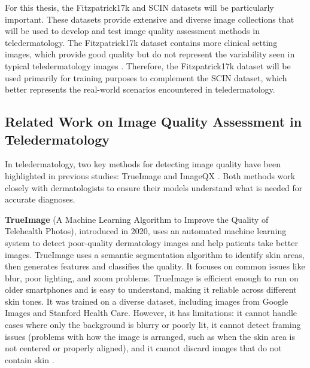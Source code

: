 \noindent
For this thesis, the Fitzpatrick17k and SCIN datasets will be particularly important. These datasets provide extensive and diverse image collections that will be used to develop and test image quality assessment methods in teledermatology. The Fitzpatrick17k dataset contains more clinical setting images, which provide good quality but do not represent the variability seen in typical teledermatology images \autocite{F17K}. Therefore, the Fitzpatrick17k dataset will be used primarily for training purposes to complement the SCIN dataset, which better represents the real-world scenarios encountered in teledermatology. \par 
\clearpage
\subsection{Related Work on Image Quality Assessment in Teledermatology}
\label{sub:ApproachesIQAinTeledermatology}
In teledermatology, two key methods for detecting image quality have been highlighted in previous studies: TrueImage \autocite{TrueImage} and ImageQX \autocite{ImageQX}. Both methods work closely with dermatologists to ensure their models understand what is needed for accurate diagnoses. \par
\vspace{\baselineskip}
\noindent
\textbf{TrueImage} (A Machine Learning Algorithm to Improve the Quality of Telehealth Photos), introduced in 2020, uses an automated machine learning system to detect poor-quality dermatology images and help patients take better images. TrueImage uses a semantic segmentation algorithm to identify skin areas, then generates features and classifies the quality. It focuses on common issues like blur, poor lighting, and zoom problems. TrueImage is efficient enough to run on older smartphones and is easy to understand, making it reliable across different skin tones. It was trained on a diverse dataset, including images from Google Images and Stanford Health Care. However, it has limitations: it cannot handle cases where only the background is blurry or poorly lit, it cannot detect framing issues (problems with how the image is arranged, such as when the skin area is not centered or properly aligned), and it cannot discard images that do not contain skin \autocite{TrueImage}. \par
\vspace{\baselineskip}
\noindent

